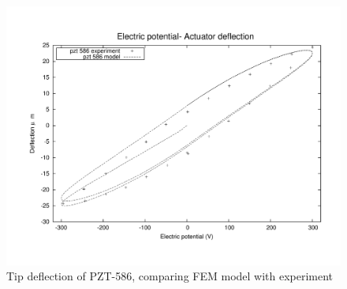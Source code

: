 \begin{figure}
\centering
\includegraphics[width=5.0in]{./chap_3_minor_loop/figures/result_pzt_586.pdf}
\caption{Tip deflection of PZT-586, comparing FEM model with experiment}
\label{fig:PZT_586_XP_Calib}
\end{figure}

